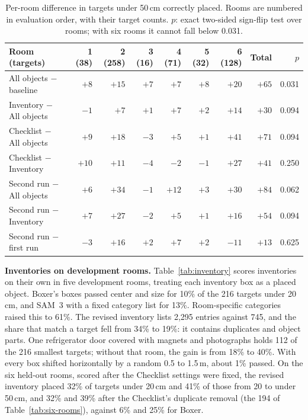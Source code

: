 \begin{table}[!htbp]
\centering\small
\caption{Per-room difference in targets under 50\,cm correctly placed.
Rooms are numbered in evaluation order, with their target counts. $p$: exact
two-sided sign-flip test over rooms; with six rooms it cannot fall below
0.031.}
\label{tab:paired}
\begin{tabular}{lrrrrrrrr}
\toprule
Room (targets) & 1 (38) & 2 (258) & 3 (16) & 4 (71) & 5 (32) & 6 (128) & Total & $p$ \\
\midrule
All objects $-$ baseline & $+8$ & $+15$ & $+7$ & $+7$ & $+8$ & $+20$ & $+65$ & 0.031 \\
Inventory $-$ All objects & $-1$ & $+7$ & $+1$ & $+7$ & $+2$ & $+14$ & $+30$ & 0.094 \\
Checklist $-$ All objects & $+9$ & $+18$ & $-3$ & $+5$ & $+1$ & $+41$ & $+71$ & 0.094 \\
Checklist $-$ Inventory & $+10$ & $+11$ & $-4$ & $-2$ & $-1$ & $+27$ & $+41$ & 0.250 \\
\midrule
Second run $-$ All objects & $+6$ & $+34$ & $-1$ & $+12$ & $+3$ & $+30$ & $+84$ & 0.062 \\
Second run $-$ Inventory & $+7$ & $+27$ & $-2$ & $+5$ & $+1$ & $+16$ & $+54$ & 0.094 \\
Second run $-$ first run & $-3$ & $+16$ & $+2$ & $+7$ & $+2$ & $-11$ & $+13$ & 0.625 \\
\bottomrule
\end{tabular}
\end{table}

\textbf{Inventories on development rooms.}
Table~\ref{tab:inventory} scores inventories on their own in five development
rooms, treating each inventory box as a placed object. Boxer's boxes passed
center and size for 10\% of the 216 targets under 20\,cm, and SAM~3 with a
fixed category list for 13\%. Room-specific categories raised this to 61\%.
The revised inventory lists 2{,}295 entries against 745, and the share that
match a target fell from 34\% to 19\%: it contains duplicates and object
parts. One refrigerator door covered with magnets and photographs holds 112
of the 216 smallest targets; without that room, the gain is from 18\% to
40\%. With every box shifted horizontally by a random 0.5 to 1.5\,m, about
1\% passed. On the six held-out rooms, scored after the Checklist settings
were fixed, the revised inventory placed 32\% of targets under 20\,cm and
41\% of those from 20 to under 50\,cm, and 32\% and 39\% after the
Checklist's duplicate removal (the 194 of Table~\ref{tab:six-rooms}),
against 6\% and 25\% for Boxer.

